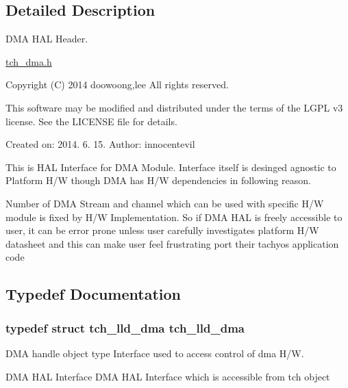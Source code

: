\subsection{Detailed Description}
D\+M\+A H\+A\+L Header. 

\hyperlink{tch__dma_8h_source}{tch\+\_\+dma.\+h}

Copyright (C) 2014 doowoong,lee All rights reserved.

This software may be modified and distributed under the terms of the L\+G\+P\+L v3 license. See the L\+I\+C\+E\+N\+S\+E file for details.

Created on\+: 2014. 6. 15. Author\+: innocentevil

This is H\+A\+L Interface for D\+M\+A Module. Interface itself is desinged agnostic to Platform H/\+W though D\+M\+A has H/\+W dependencies in following reason.
\begin{DoxyItemize}
\item Number of D\+M\+A Stream and channel which can be used with specific H/\+W module is fixed by H/\+W Implementation. So if D\+M\+A H\+A\+L is freely accessible to user, it can be error prone unless user carefully investigates platform H/\+W datasheet and this can make user feel frustrating port their tachyos application code 
\end{DoxyItemize}

\subsection{Typedef Documentation}
\hypertarget{group___d_m_a___h_a_l_ga4f23199bd140de283076126336d999e4}{
\subsubsection[{tch\+\_\+lld\+\_\+dma}]{\setlength{\rightskip}{0pt plus 5cm}typedef struct {\bf tch\+\_\+lld\+\_\+dma} {\bf tch\+\_\+lld\+\_\+dma}}}\label{group___d_m_a___h_a_l_ga4f23199bd140de283076126336d999e4}


D\+M\+A handle object type Interface used to access control of dma H/\+W. 

D\+M\+A H\+A\+L Interface D\+M\+A H\+A\+L Interface which is accessible from tch object 